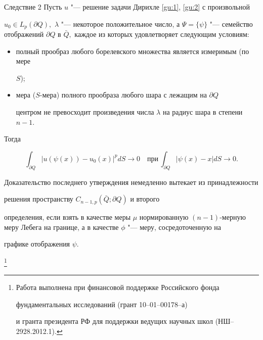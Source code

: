 \begin{newthm}{Следствие 2} Пусть $u$ "--- решение задачи Дирихле \eqref{gu:1}{\rm ,} \eqref{gu:2} с произвольной

$u_0 \in L_p(\partial Q),$ $\lambda$ "--- некоторое положительное число{\rm ,} а $\Psi = \{ \psi\}$ "--- семейство отображений $\partial Q$ в $\bar {Q}, $ каждое из которых удовлетворяет следующим условиям\/{\rm :} 

\begin{itemize}

\item[ $a)$] полный прообраз любого борелевского множества является измеримым {\rm (}по мере

$S${\rm );}



\item[$b)$] мера {\rm (}$S$-мера{\rm )} полного прообраза любого шара с лежащим на $\partial Q$

центром не превосходит произведения числа $\lambda$ на радиус шара в степени $n - 1.$

\end{itemize}

Тогда

$$

\int_{\partial Q} |u(\psi(x)) - u_0(x)|^p dS \to 0 \quad \mbox{при} \,

\int_{\partial Q} |\psi(x) - x| dS \to 0 .

$$

\end{newthm}



\smallskip



Доказательство последнего утверждения немедленно вытекает из принадлежности

решения пространству  $C_{n-1,p}(\bar {Q} ; \partial Q)$ и второго

определения, если взять в качестве меры $\mu$ нормированную $(n-1)$-мерную меру Лебега на границе, а в качестве $\phi$ "---  меру, сосредоточенную на

графике отображения $\psi$. 




\thanks{Работа выполнена при финансовой поддержке Российского фонда

фундаментальных исследований (грант  10--01--00178--а)

и гранта президента РФ для поддержки ведущих научных школ (НШ--2928.2012.1).}

